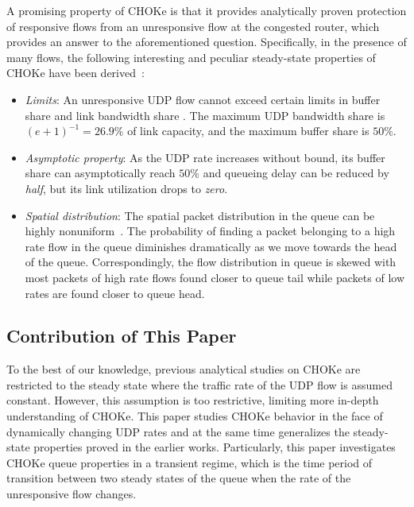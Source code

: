 \documentclass{IEEEtran}
\begin{document}
A promising property of CHOKe is that it provides analytically proven protection of responsive flows from an unresponsive flow at the congested router, which provides an answer to the aforementioned question. Specifically, in the presence of many flows, the following interesting and peculiar steady-state properties of CHOKe have been derived~\cite{ChokeToN04,ChokeSigmetrics03, allertonCHOKe01}:
\begin{itemize}
    \item \emph{Limits}: An unresponsive UDP flow cannot exceed certain limits in buffer share and link bandwidth share \cite{ChokeSigmetrics03, allertonCHOKe01}. The maximum UDP bandwidth share is $(e+1)^{-1}=26.9\%$ of link capacity, and the maximum buffer share is $50\%$.\item \emph{Asymptotic property}: As the UDP rate increases without bound, its buffer share can asymptotically reach $50\%$ and queueing delay can be reduced by \emph{half}, but its link utilization drops to \emph{zero}. \item \emph{Spatial distribution}:  The spatial packet distribution in the queue can be highly nonuniform~\cite{ChokeToN04}. The probability of finding  a packet belonging to a high rate flow  in the queue diminishes dramatically as we move towards the head of the queue. Correspondingly, the flow distribution in queue is skewed with most packets of high rate flows found closer to queue tail while packets of low rates are found closer to queue head. \end{itemize}

    \subsection{Contribution of This Paper}

To the best of our knowledge, previous analytical studies on CHOKe \cite{ChokeToN04, ChokeSigmetrics03, allertonCHOKe01} are restricted to the steady state where the traffic rate of the UDP flow is assumed constant.  However, this assumption is too restrictive, limiting more in-depth understanding of CHOKe. This paper studies CHOKe behavior in the face of dynamically changing UDP rates and at the same time generalizes the steady-state properties proved in the earlier works. Particularly, this paper investigates CHOKe queue properties in a transient regime, which is the time period of transition between two steady states of the queue when the rate of the unresponsive flow changes. 
\end{document}
